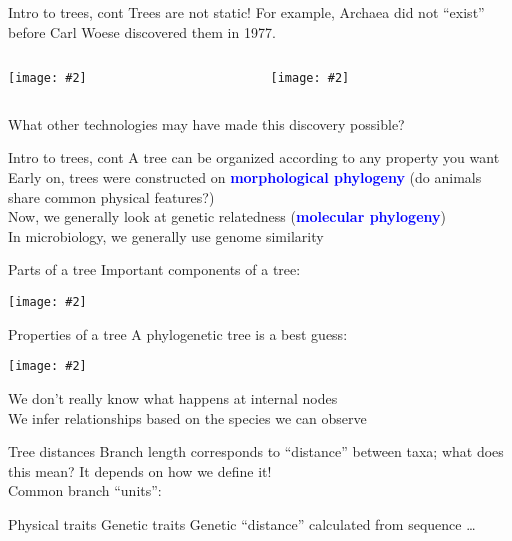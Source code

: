 \documentclass{beamer}
\renewcommand{\c}[1]{\begin{center}#1\end{center}}
\newcommand{\blu}[1]{\textcolor{blue}{\textbf{#1}}}
\newcommand{\gr}[2][.95]{\c{\texttt{[image: \#2]}}}
\begin{document}
\begin{frame}{Intro to trees, cont}
    Trees are not static! For example, Archaea did not ``exist'' before Carl Woese discovered them in 1977.\\
    \bigskip
    \begin{columns}
        \begin{column}{0.5\textwidth}
            \gr{l5_figs/s4_tree_no_archaea.png}
        \end{column}
        \begin{column}{0.5\textwidth}
            \gr{l5_figs/s4_tree_archaea.png}
        \end{column}
    \end{columns}
    \bigskip
    What other technologies may have made this discovery possible?
\end{frame}

\begin{frame}{Intro to trees, cont}
    A tree can be organized according to any property you want\\
    \bigskip
    Early on, trees were constructed on \blu{morphological phylogeny} (do animals share common physical features?)\\
    \bigskip
    Now, we generally look at genetic relatedness (\blu{molecular phylogeny})\\
    \bigskip
    In microbiology, we generally use genome similarity
\end{frame}


\begin{frame}{Parts of a tree}
Important components of a tree:
\gr{l5_figs/s6_tree1.png}
\end{frame}

\begin{frame}{Properties of a tree}
A phylogenetic tree is a best guess:
\gr{l5_figs/s7_tree2.png}
We don't really know what happens at internal nodes\\
\bigskip
We infer relationships based on the species we can observe
\end{frame}

\begin{frame}{Tree distances}
Branch length corresponds to ``distance'' between taxa; what does this mean? It depends on how we define it!\\
\bigskip
Common branch ``units'':
\begin{outline}
    \1 Physical traits
    \1 Genetic traits
    \1 Genetic ``distance'' calculated from sequence
    \1 \ldots
\end{outline}
\end{frame}
\end{document}
